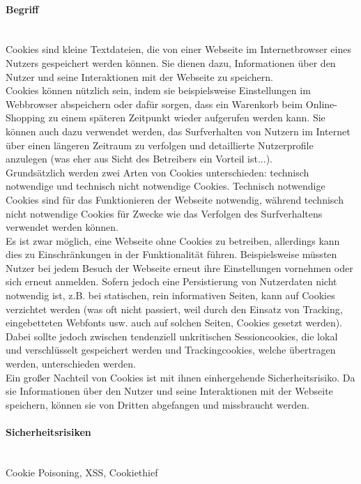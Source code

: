 \documentclass[notitlepage, hidelinks]{article}
\begin{document}
\paragraph{Begriff} \mbox{} \\
Cookies sind kleine Textdateien, die von einer Webseite im Internetbrowser eines Nutzers gespeichert werden können. Sie dienen dazu, Informationen über den Nutzer und seine Interaktionen mit der Webseite zu speichern. \\
Cookies können nützlich sein, indem sie beispielsweise Einstellungen im Webbrowser abspeichern oder dafür sorgen, dass ein Warenkorb beim Online-Shopping zu einem späteren Zeitpunkt wieder aufgerufen werden kann. Sie können auch dazu verwendet werden, das Surfverhalten von Nutzern im Internet über einen längeren Zeitraum zu verfolgen und detaillierte Nutzerprofile anzulegen (was eher aus Sicht des Betreibers ein Vorteil ist...). \\
Grundsätzlich werden zwei Arten von Cookies unterschieden: technisch notwendige und technisch nicht notwendige Cookies. Technisch notwendige Cookies sind für das Funktionieren der Webseite notwendig, während technisch nicht notwendige Cookies für Zwecke wie das Verfolgen des Surfverhaltens verwendet werden können. \\
Es ist zwar möglich, eine Webseite ohne Cookies zu betreiben, allerdings kann dies zu Einschränkungen in der Funktionalität führen. Beispielsweise müssten Nutzer bei jedem Besuch der Webseite erneut ihre Einstellungen vornehmen oder sich erneut anmelden. Sofern jedoch eine Persistierung von Nutzerdaten nicht notwendig ist, z.B. bei statischen, rein informativen Seiten, kann auf Cookies verzichtet werden (was oft nicht passiert, weil durch den Einsatz von Tracking, eingebetteten Webfonts usw. auch auf solchen Seiten, Cookies gesetzt werden). Dabei sollte jedoch zwischen tendenziell unkritischen Sessioncookies, die lokal und verschlüsselt gespeichert werden und Trackingcookies, welche übertragen werden, unterschieden werden.   \\  
Ein großer Nachteil von Cookies ist mit ihnen einhergehende Sicherheitsrisiko. Da sie Informationen über den Nutzer und seine Interaktionen mit der Webseite speichern, können sie von Dritten abgefangen und missbraucht werden.

\paragraph{Sicherheitsrisiken} \mbox{} \\
Cookie Poisoning, XSS, Cookiethief
\end{document}
